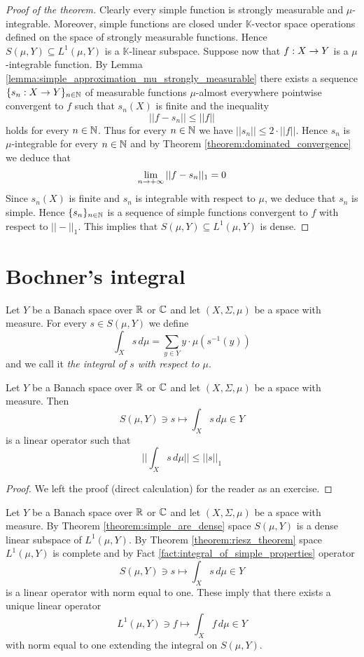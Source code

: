 \begin{proof}[Proof of the theorem]
Clearly every simple function is strongly measurable and $\mu$-integrable. Moreover, simple functions are closed under $\mathbb{K}$-vector space operations defined on the space of strongly measurable functions. Hence $S(\mu, Y)\subseteq L^1(\mu, Y)$ is a $\mathbb{K}$-linear subspace. Suppose now that $f:X\rightarrow Y$ is a $\mu$-integrable function. By Lemma \ref{lemma:simple_approximation_mu_strongly_measurable} there exists a sequence $\{s_n:X\rightarrow Y\}_{n\in {\mathbb N}}$ of measurable functions $\mu$-almost everywhere pointwise convergent to $f$ such that $s_n(X)$ is finite and the inequality
$$||f - s_n||\leq ||f||$$
holds for every $n\in {\mathbb N}$. Thus for every $n\in {\mathbb N}$ we have $||s_n||\leq 2\cdot ||f||$. Hence $s_n$ is $\mu$-integrable for every $n\in {\mathbb N}$ and by Theorem \ref{theorem:dominated_convergence} we deduce that
$$\lim_{n\rightarrow +\infty}||f - s_n||_1 = 0$$
Since $s_n(X)$ is finite and $s_n$ is integrable with respect to $\mu$, we deduce that $s_n$ is simple. Hence $\{s_n\}_{n\in {\mathbb N}}$ is a sequence of simple functions convergent to $f$ with respect to $||-||_1$. This implies that $S(\mu, Y)\subseteq L^1(\mu, Y)$ is dense.
\end{proof}

\section{Bochner's integral}\label{section:bochner_integration}

\begin{definition}
Let $Y$ be a Banach space over ${\mathbb R}$ or ${\mathbb C}$ and let $(X,\Sigma,\mu)$ be a space with measure. For every $s \in S(\mu, Y)$ we define
$$\int_X s\,d\mu = \sum_{y\in Y}y\cdot \mu\left(s^{-1}(y)\right)$$
and we call it \textit{the integral of $s$ with respect to $\mu$}.
\end{definition}

\begin{fact}\label{fact:integral_of_simple_properties}
Let $Y$ be a Banach space over ${\mathbb R}$ or ${\mathbb C}$ and let $(X,\Sigma,\mu)$ be a space with measure. Then
$$S(\mu, Y)\ni s \mapsto \int_Xs\,d\mu \in Y$$
is a linear operator such that
$$\bigg|\bigg|\int_Xs\,d\mu\bigg|\bigg|\leq ||s||_1$$
\end{fact}
\begin{proof}
We left the proof (direct calculation) for the reader as an exercise.
\end{proof}
\noindent
Let $Y$ be a Banach space over ${\mathbb R}$ or ${\mathbb C}$ and let $(X,\Sigma,\mu)$ be a space with measure. By Theorem \ref{theorem:simple_are_dense} space $S(\mu, Y)$ is a dense linear subspace of $L^1(\mu, Y)$. By Theorem \ref{theorem:riesz_theorem} space $L^1(\mu, Y)$ is complete and by Fact \ref{fact:integral_of_simple_properties} operator
$$S(\mu, Y)\ni s \mapsto \int_Xs\,d\mu \in Y$$
is a linear operator with norm equal to one. These imply that there exists a unique linear operator
$$L^1(\mu, Y)\ni f\mapsto \int_Xf\,d\mu\in Y$$
with norm equal to one extending the integral on $S(\mu, Y)$.

